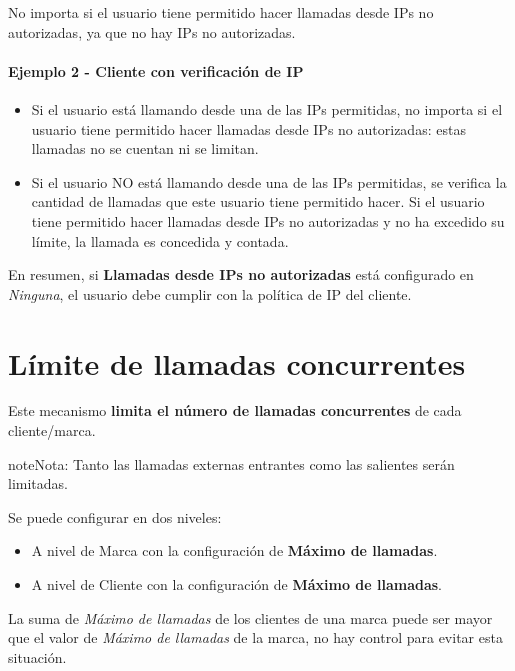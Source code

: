 \documentclass[letterpaper,10pt,spanish]{sphinxmanual}
\begin{document}
No importa si el usuario tiene permitido hacer llamadas desde IPs no autorizadas, ya que no hay IPs no autorizadas.
\paragraph{Ejemplo 2 - Cliente con verificación de IP}
\begin{itemize}
\item {} 
Si el usuario está llamando desde una de las IPs permitidas, no importa si el usuario tiene permitido hacer llamadas desde IPs no autorizadas: estas llamadas no se cuentan ni se limitan.

\item {} 
Si el usuario NO está llamando desde una de las IPs permitidas, se verifica la cantidad de llamadas que este usuario tiene permitido hacer. Si el usuario tiene permitido hacer llamadas desde IPs no autorizadas y no ha excedido su límite, la llamada es concedida y contada.

\end{itemize}

En resumen, si \textbf{Llamadas desde IPs no autorizadas} está configurado en \emph{Ninguna}, el usuario debe cumplir con la política de IP del cliente.


\section{Límite de llamadas concurrentes}
\label{security_and_maintenance/security/concurrent_call_limit::doc}\label{security_and_maintenance/security/concurrent_call_limit:concurrent-call-limit}
Este mecanismo \textbf{limita el número de llamadas concurrentes} de cada cliente/marca.

\begin{notice}{note}{Nota:}
Tanto las llamadas externas entrantes como las salientes serán limitadas.
\end{notice}

Se puede configurar en dos niveles:
\begin{itemize}
\item {} 
A nivel de Marca con la configuración de \textbf{Máximo de llamadas}.

\item {} 
A nivel de Cliente con la configuración de \textbf{Máximo de llamadas}.

\end{itemize}

La suma de \emph{Máximo de llamadas} de los clientes de una marca puede ser mayor que el valor de \emph{Máximo de llamadas} de la marca, no hay control para evitar esta situación.
\end{document}
